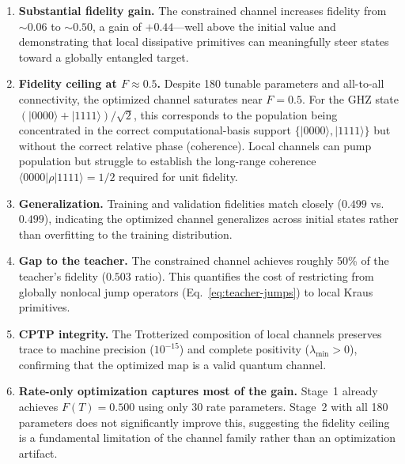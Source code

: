 \documentclass[11pt,a4paper]{article}
\newcommand{\ket}[1]{\lvert #1 \rangle}
\newcommand{\bra}[1]{\langle #1 \rvert}
\begin{document}
\begin{enumerate}
  \item \textbf{Substantial fidelity gain.}
    The constrained channel increases fidelity from $\sim\!0.06$ to
    $\sim\!0.50$, a gain of $+0.44$---well above the initial value
    and demonstrating that local dissipative primitives can
    meaningfully steer states toward a globally entangled target.

  \item \textbf{Fidelity ceiling at $F \approx 0.5$.}
    Despite 180 tunable parameters and all-to-all connectivity,
    the optimized channel saturates near $F=0.5$.  For the GHZ state
    $(\ket{0000}+\ket{1111})/\sqrt{2}$, this corresponds to the
    population being concentrated in the correct computational-basis
    support $\{\ket{0000},\ket{1111}\}$ but without the correct
    relative phase (coherence).  Local channels can pump population
    but struggle to establish the long-range coherence
    $\bra{0000}\rho\ket{1111} = 1/2$ required for unit fidelity.

  \item \textbf{Generalization.}
    Training and validation fidelities match closely
    ($0.499$ vs.\ $0.499$), indicating the optimized channel
    generalizes across initial states rather than overfitting
    to the training distribution.

  \item \textbf{Gap to the teacher.}
    The constrained channel achieves roughly 50\% of the teacher's
    fidelity ($0.503$ ratio).  This quantifies the cost of
    restricting from globally nonlocal jump operators
    (Eq.~\ref{eq:teacher-jumps}) to local Kraus primitives.

  \item \textbf{CPTP integrity.}
    The Trotterized composition of local channels preserves
    trace to machine precision ($10^{-15}$) and complete
    positivity ($\lambda_{\min} > 0$), confirming that the
    optimized map is a valid quantum channel.

  \item \textbf{Rate-only optimization captures most of the gain.}
    Stage~1 already achieves $F(T)=0.500$ using only 30 rate
    parameters.  Stage~2 with all 180 parameters does not
    significantly improve this, suggesting the fidelity ceiling
    is a fundamental limitation of the channel family rather
    than an optimization artifact.
\end{enumerate}

\end{document}
